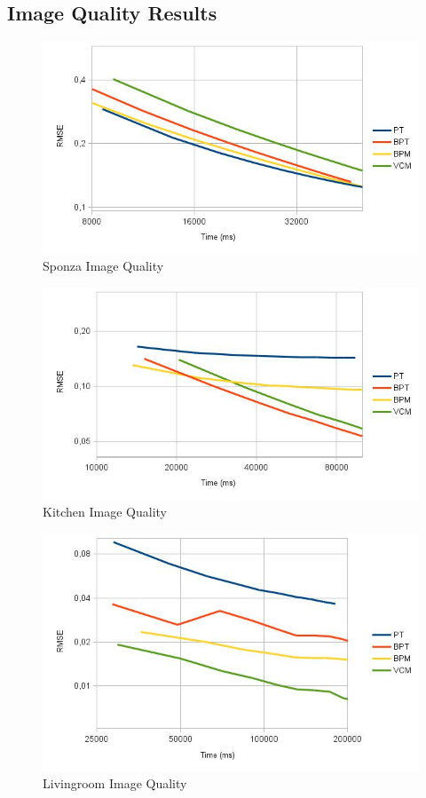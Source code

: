 \subsection{Image Quality Results}

\begin{figure}[H]
\centering
\includegraphics[width=0.8\linewidth]{img/sponzaImgq.jpg}
\caption{\label{img:sponzaImgq} Sponza Image Quality}
\end{figure}

\begin{figure}[H]
\centering
\includegraphics[width=0.8\linewidth]{img/kitchenImgq.jpg}
\caption{\label{img:kitchenImgq} Kitchen Image Quality}
\end{figure}

\begin{figure}[H]
\centering
\includegraphics[width=0.8\linewidth]{img/livingroomImgq.jpg}
\caption{\label{img:livingroomImgq} Livingroom Image Quality}
\end{figure}

